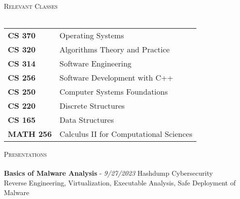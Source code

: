\documentclass[a4paper]{article}
\newcommand{\lineunder} {
    \vspace*{-8pt} \\
    \hspace*{-18pt} \hrulefill \\
}
\newcommand{\header} [1] {
    {\hspace*{-18pt}\vspace*{6pt} \textsc{#1}}
    \vspace*{-6pt} \lineunder
}
\begin{document}
\header{Relevant Classes}
\begin{tabular}{ l l }
    \textbf{CS 370} & Operating Systems\\
    \textbf{CS 320} & Algorithms Theory and Practice\\
	\textbf{CS 314} & Software Engineering\\
	\textbf{CS 256} & Software Development with C++\\
    \textbf{CS 250} & Computer Systems Foundations\\
	\textbf{CS 220} & Discrete Structures\\
    \textbf{CS 165} & Data Structures\\ 
    \textbf{MATH 256} & Calculus II for Computational Sciences\\
\end{tabular}
\vspace*{2mm}

\header{Presentations}
{\textbf{Basics of Malware Analysis}} - {\sl 9/27/2023} \hfill Hashdump Cybersecurity\\
Reverse Engineering, Virtualization, Executable Analysis, Safe Deployment of Malware\\

\ 
\end{document}
